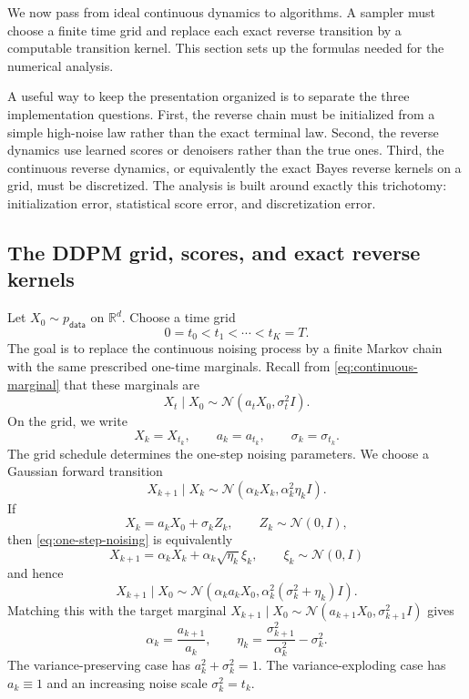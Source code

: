 \documentclass[10pt,a4paper]{amsart}
\numberwithin{equation}{section}
\newcommand{\R}{\mathbb{R}}
\newcommand{\Id}{I}
\newcommand{\pdata}{p_{\mathsf{data}}}
\newcommand{\normal}[2]{\mathcal{N}\!\left(#1,#2\right)}
\begin{document}
We now pass from ideal continuous dynamics to algorithms.  A sampler must
choose a finite time grid and replace each exact reverse transition by a
computable transition kernel.  This section sets up the formulas needed
for the numerical analysis.

A useful way to keep the presentation organized is to separate the three
implementation questions.  First, the reverse chain must be initialized from a
simple high-noise law rather than the exact terminal law.  Second, the reverse
dynamics use learned scores or denoisers rather than the true ones.  Third, the
continuous reverse dynamics, or equivalently the exact Bayes reverse kernels on
a grid, must be discretized.  The analysis is built around exactly this
trichotomy: initialization error, statistical score error, and discretization
error.

\subsection{The DDPM grid, scores, and exact reverse kernels}
\label{subsec:ddpm-grid}

Let $X_0\sim\pdata$ on $\R^d$.  Choose a time grid
\[
    0=t_0<t_1<\cdots<t_K=T.
\]
The goal is to replace the continuous noising process by a finite Markov chain with the same prescribed one-time
marginals.  Recall from \eqref{eq:continuous-marginal} that these marginals are
\[
    X_t\mid X_0\sim\normal{a_tX_0}{\sigma_t^2\Id}.
\]
On the grid, we write
\[
   X_k = X_{t_k}, \qquad  a_k=a_{t_k}, \qquad \sigma_k=\sigma_{t_k}.
\]
The grid schedule determines the one-step noising parameters.  We choose a
Gaussian forward transition
\begin{equation}\label{eq:one-step-noising}
    X_{k+1}\mid X_k
    \sim
    \normal{\alpha_k X_k}{\alpha_k^2\eta_k\Id}.
\end{equation}
If
\[
    X_k=a_kX_0+\sigma_k Z_k,\qquad Z_k\sim\normal{0}{\Id},
\]
then \eqref{eq:one-step-noising} is equivalently
\[
    X_{k+1}=\alpha_kX_k+\alpha_k\sqrt{\eta_k}\xi_k,
    \qquad \xi_k\sim\normal{0}{\Id}
\]
and hence
\[
    X_{k+1}\mid X_0
    \sim
    \normal{
    \alpha_k a_kX_0
    }{
    \alpha_k^2(\sigma_k^2+\eta_k)\Id
    }.
\]
Matching this with the target marginal
$X_{k+1}\mid X_0\sim\normal{a_{k+1}X_0}{\sigma_{k+1}^2\Id}$ gives
\[
    \alpha_k=\frac{a_{k+1}}{a_k},
    \qquad
    \eta_k=\frac{\sigma_{k+1}^2}{\alpha_k^2}-\sigma_k^2.
\]
The variance-preserving case has $a_k^2+\sigma_k^2=1$.  The
variance-exploding case has $a_k\equiv1$ and an increasing noise scale $\sigma_k^2=t_k$.
\end{document}
